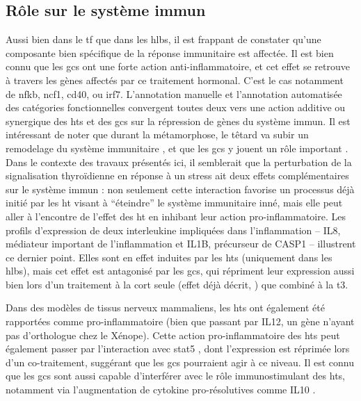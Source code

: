 \documentclass[../main.tex]{subfiles}
\begin{document}
	\subsection{Rôle sur le système immun}
		Aussi bien dans le \gls{tf} que dans les \glspl{hlb}, il est frappant de constater qu'une composante bien spécifique de la réponse immunitaire est affectée.
		Il est bien connu que les \glspl{gc} ont une forte action anti-inflammatoire, et cet effet se retrouve à travers les gènes affectés par ce traitement hormonal.
		C'est le cas notamment de \gls{nfkb}, \gls{ncf1}, \gls{cd40}, ou \gls{irf7}.
		L'annotation manuelle et l'annotation automatisée des catégories fonctionnelles convergent toutes deux vers une action additive ou synergique des \glspl{ht} et des \glspl{gc} sur la répression de gènes du système immun.
		Il est intéressant de noter que durant la métamorphose, le têtard va subir un remodelage du système immunitaire \citep{DuPasquier1989,Flajnik1987}, et que les \glspl{gc} y jouent un rôle important \citep{Rollins-Smith1997}.
		Dans le contexte des travaux présentés ici, il semblerait que la perturbation de la signalisation thyroïdienne en réponse à un stress ait deux effets complémentaires sur le système immun :
		non seulement cette interaction favorise un processus déjà initié par les \gls{ht} visant à ``éteindre'' le système immunitaire inné, mais elle peut aller à l'encontre de l'effet des \gls{ht} en inhibant leur action pro-inflammatoire.
		Les profils d'expression de deux interleukine impliquées dans l'inflammation – IL8, médiateur important de l'inflammation et IL1B, précurseur de CASP1 – illustrent ce dernier point.
		Elles sont en effet induites par les \glspl{ht} (uniquement dans les \glspl{hlb}), mais cet effet est antagonisé par les \glspl{gc}, qui répriment leur expression aussi bien lors d'un traitement à la \gls{cort} seule (effet déjà décrit, \citealp{Nissen2000}) que combiné à la \gls{t3}.
		\par
		Dans des modèles de tissus nerveux mammaliens, les \glspl{ht} ont également été rapportées comme pro-inflammatoire \citep{Tamura1999,Montesinos2012} (bien que passant par IL12, un gène n'ayant pas d'orthologue chez le Xénope).
		Cette action pro-inflammatoire des \glspl{ht} peut également passer par l’interaction avec \gls{stat5} \citep{Favre-Young2000}, dont l'expression est réprimée lors d'un co-traitement, suggérant que les \glspl{gc} pourraient agir à ce niveau.
		Il est connu que les \glspl{gc} sont aussi capable d'interférer avec le rôle immunostimulant des \glspl{ht}, notamment via l'augmentation de cytokine pro-résolutives comme IL10 \citep{Montesinos2012}.
\end{document}
